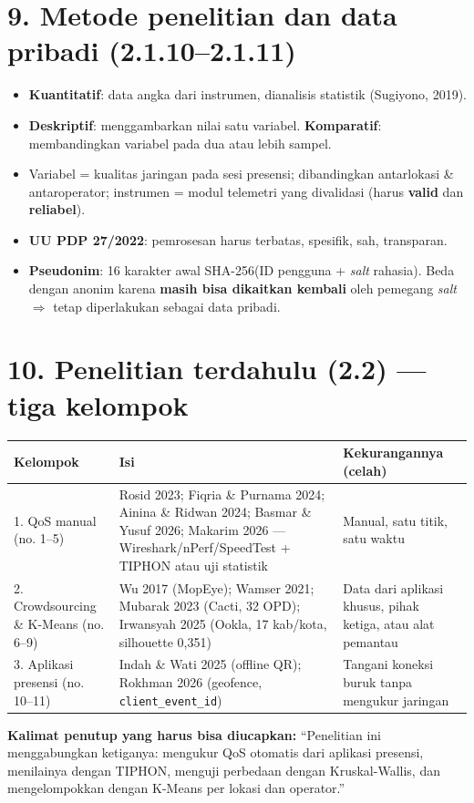 \section*{9. Metode penelitian dan data pribadi (2.1.10--2.1.11)}
\begin{itemize}
  \item \textbf{Kuantitatif}: data angka dari instrumen, dianalisis statistik (Sugiyono, 2019).
  \item \textbf{Deskriptif}: menggambarkan nilai satu variabel. \textbf{Komparatif}: membandingkan variabel pada dua atau lebih sampel.
  \item Variabel = kualitas jaringan pada sesi presensi; dibandingkan antarlokasi \& antaroperator; instrumen = modul telemetri yang divalidasi (harus \textbf{valid} dan \textbf{reliabel}).
  \item \textbf{UU PDP 27/2022}: pemrosesan harus terbatas, spesifik, sah, transparan.
  \item \textbf{Pseudonim}: 16 karakter awal SHA-256(ID pengguna + \textit{salt} rahasia). Beda dengan anonim karena \textbf{masih bisa dikaitkan kembali} oleh pemegang \textit{salt} $\Rightarrow$ tetap diperlakukan sebagai data pribadi.
\end{itemize}

\section*{10. Penelitian terdahulu (2.2) --- tiga kelompok}
\begin{center}
\begin{tabularx}{\linewidth}{@{}p{3.1cm}Xp{4.4cm}@{}}
\toprule
Kelompok & Isi & Kekurangannya (celah)\\
\midrule
1. QoS manual (no. 1--5) & Rosid 2023; Fiqria \& Purnama 2024; Ainina \& Ridwan 2024; Basmar \& Yusuf 2026; Makarim 2026 --- Wireshark/nPerf/SpeedTest + TIPHON atau uji statistik & Manual, satu titik, satu waktu\\
2. Crowdsourcing \& K-Means (no. 6--9) & Wu 2017 (MopEye); Wamser 2021; Mubarak 2023 (Cacti, 32 OPD); Irwansyah 2025 (Ookla, 17 kab/kota, silhouette 0,351) & Data dari aplikasi khusus, pihak ketiga, atau alat pemantau\\
3. Aplikasi presensi (no. 10--11) & Indah \& Wati 2025 (offline QR); Rokhman 2026 (geofence, \texttt{client\_event\_id}) & Tangani koneksi buruk tanpa mengukur jaringan\\
\bottomrule
\end{tabularx}
\end{center}
\textbf{Kalimat penutup yang harus bisa diucapkan:} ``Penelitian ini menggabungkan ketiganya: mengukur QoS otomatis dari aplikasi presensi, menilainya dengan TIPHON, menguji perbedaan dengan Kruskal-Wallis, dan mengelompokkan dengan K-Means per lokasi dan operator.''

